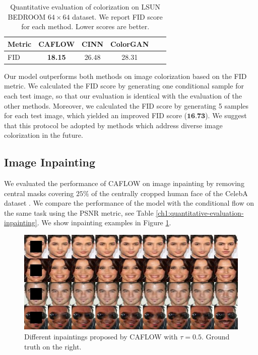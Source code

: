 \begin{table}[h!]
    \centering
    
    \caption{Quantitative evaluation of colorization on LSUN BEDROOM $64\times 64$ dataset. We report FID score for each method. Lower scores are better. }
    \label{ch1:colorisation-comparison}
    \setlength{\tabcolsep}{3pt}
    
    \begin{tabular}{l|ccccc}
     Metric &    \textbf{CAFLOW} &   CINN \cite{ardizzone2019guided}     &   ColorGAN \cite{colorGAN}  \\
    
    \midrule
      FID &  \textbf{18.15} & 26.48 &  28.31 \\
    
    \end{tabular}
\end{table}

Our model outperforms both methods on image colorization based on the FID metric. We calculated the FID score by generating one conditional sample for each test image, so that our evaluation is identical with the evaluation of the other methods. Moreover, we calculated the FID score by generating 5 samples for each test image, which yielded an improved FID score ($\textbf{16.73}$). We suggest that this protocol be adopted by methods which address diverse image colorization in the future. 

\subsection{Image Inpainting}

We evaluated the performance of CAFLOW on image inpainting by removing central masks covering $25\%$ of the centrally cropped human face of the CelebA dataset \cite{liu2015deep}. We compare the performance of the model with the conditional flow \cite{cGLOW} on the same task using the PSNR metric, see Table \ref{ch1:quantitative-evaluation-inpainting}. We show inpainting examples in Figure \ref{ch1:qualitative-performance-inpainting}.

\begin{figure}[h!]
    \centering
    \includegraphics[width=.8\textwidth]{Chapter1/paper_graphs/inpainting/even_smaller_merged.jpg}
    \caption{Different inpaintings proposed by CAFLOW with $\tau=0.5$. Ground truth on the right.}
    \label{ch1:qualitative-performance-inpainting}
\end{figure}

